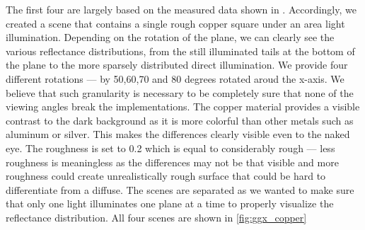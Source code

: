 The first four are largely based on the measured data shown in \citet{walter2007microfacet}. Accordingly, we created a scene that contains a single rough copper square under an area light illumination. Depending on the rotation of the plane, we can clearly see the various reflectance distributions, from the still illuminated tails at the bottom of the plane to the more sparsely distributed direct illumination. We provide four different rotations --- by 50,60,70 and 80 degrees rotated aroud the x-axis. We believe that such granularity is necessary to be completely sure that none of the viewing angles break the implementations. The copper material provides a visible contrast to the dark background as it is more colorful than other metals such as aluminum or silver. This makes the differences clearly visible even to the naked eye. The roughness is set to 0.2 which is equal to considerably rough --- less roughness is meaningless as the differences may not be that visible and more roughness could create unrealistically rough surface that could be hard to differentiate from a diffuse. The scenes are separated as we wanted to make sure that only one light illuminates one plane at a time to properly visualize the reflectance distribution. All four scenes are shown in \autoref{fig:ggx_copper}

